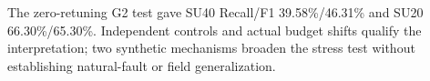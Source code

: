 The zero-retuning G2 test gave SU40 Recall/F1 39.58\%/46.31\% and SU20 66.30\%/65.30\%. Independent controls and actual budget shifts qualify the interpretation; two synthetic mechanisms broaden the stress test without establishing natural-fault or field generalization.

